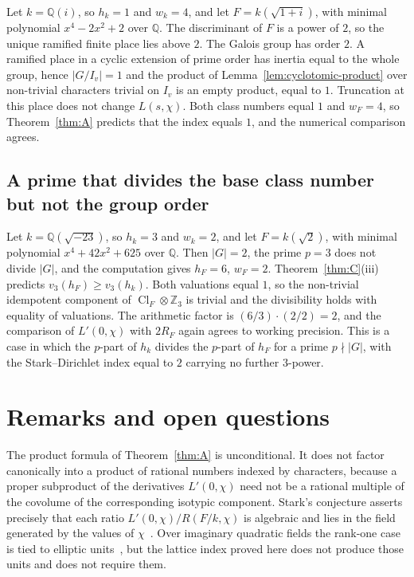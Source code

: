 \documentclass[11pt]{article}
\theoremstyle{plain}
\theoremstyle{definition}
\theoremstyle{remark}
\newcommand{\Z}{\mathbb{Z}}
\newcommand{\Q}{\mathbb{Q}}
\newcommand{\Cl}{\operatorname{Cl}}
\begin{document}
Let $k=\Q(i)$, so $h_k=1$ and $w_k=4$, and let $F=k(\sqrt{1+i})$, with minimal polynomial $x^{4}-2x^{2}+2$ over $\Q$.
The discriminant of $F$ is a power of $2$, so the unique ramified finite place lies above $2$.
The Galois group has order $2$.
A ramified place in a cyclic extension of prime order has inertia equal to the whole group, hence $|G/I_v|=1$ and the product of Lemma~\ref{lem:cyclotomic-product} over non-trivial characters trivial on $I_v$ is an empty product, equal to $1$.
Truncation at this place does not change $L(s,\chi)$.
Both class numbers equal $1$ and $w_F=4$, so Theorem~\ref{thm:A} predicts that the index equals $1$, and the numerical comparison agrees.

\subsection{A prime that divides the base class number but not the group order}

Let $k=\Q(\sqrt{-23})$, so $h_k=3$ and $w_k=2$, and let $F=k(\sqrt{2})$, with minimal polynomial $x^{4}+42x^{2}+625$ over $\Q$.
Then $|G|=2$, the prime $p=3$ does not divide $|G|$, and the computation gives $h_F=6$, $w_F=2$.
Theorem~\ref{thm:C}(iii) predicts $v_3(h_F)\ge v_3(h_k)$.
Both valuations equal $1$, so the non-trivial idempotent component of $\Cl_F\otimes\Z_3$ is trivial and the divisibility holds with equality of valuations.
The arithmetic factor is $(6/3)\cdot(2/2)=2$, and the comparison of $L'(0,\chi)$ with $2R_F$ again agrees to working precision.
This is a case in which the $p$-part of $h_k$ divides the $p$-part of $h_F$ for a prime $p\nmid|G|$, with the Stark--Dirichlet index equal to $2$ carrying no further $3$-power.

\section{Remarks and open questions}
\label{sec:remarks}

The product formula of Theorem~\ref{thm:A} is unconditional.
It does not factor canonically into a product of rational numbers indexed by characters, because a proper subproduct of the derivatives $L'(0,\chi)$ need not be a rational multiple of the covolume of the corresponding isotypic component.
Stark's conjecture asserts precisely that each ratio $L'(0,\chi)/R(F/k,\chi)$ is algebraic and lies in the field generated by the values of $\chi$~\cite{Stark,TateStark}.
Over imaginary quadratic fields the rank-one case is tied to elliptic units~\cite{Robert,RubinElliptic}, but the lattice index proved here does not produce those units and does not require them.
\end{document}
